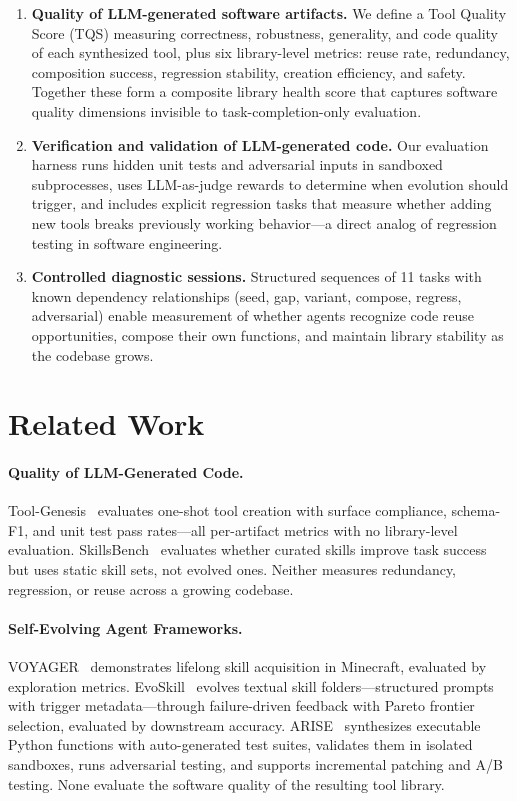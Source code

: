 \documentclass[]{ceurart}
\begin{document}
\begin{enumerate}
\item \textbf{Quality of LLM-generated software artifacts.} We define a Tool Quality Score (TQS) measuring correctness, robustness, generality, and code quality of each synthesized tool, plus six library-level metrics: reuse rate, redundancy, composition success, regression stability, creation efficiency, and safety. Together these form a composite library health score that captures software quality dimensions invisible to task-completion-only evaluation.

\item \textbf{Verification and validation of LLM-generated code.} Our evaluation harness runs hidden unit tests and adversarial inputs in sandboxed subprocesses, uses LLM-as-judge rewards to determine when evolution should trigger, and includes explicit regression tasks that measure whether adding new tools breaks previously working behavior---a direct analog of regression testing in software engineering.

\item \textbf{Controlled diagnostic sessions.} Structured sequences of 11 tasks with known dependency relationships (seed, gap, variant, compose, regress, adversarial) enable measurement of whether agents recognize code reuse opportunities, compose their own functions, and maintain library stability as the codebase grows.
\end{enumerate}

\section{Related Work}

\paragraph{Quality of LLM-Generated Code.} Tool-Genesis~\cite{xia2026toolgenesis} evaluates one-shot tool creation with surface compliance, schema-F1, and unit test pass rates---all per-artifact metrics with no library-level evaluation. SkillsBench~\cite{skillsbench2026} evaluates whether curated skills improve task success but uses static skill sets, not evolved ones. Neither measures redundancy, regression, or reuse across a growing codebase.

\paragraph{Self-Evolving Agent Frameworks.} VOYAGER~\cite{wang2023voyager} demonstrates lifelong skill acquisition in Minecraft, evaluated by exploration metrics. EvoSkill~\cite{alzubi2026evoskill} evolves textual skill folders---structured prompts with trigger metadata---through failure-driven feedback with Pareto frontier selection, evaluated by downstream accuracy. ARISE~\cite{kaliyev2026arise} synthesizes executable Python functions with auto-generated test suites, validates them in isolated sandboxes, runs adversarial testing, and supports incremental patching and A/B testing. None evaluate the software quality of the resulting tool library.
\end{document}
